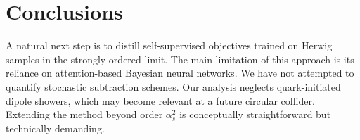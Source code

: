 \section{Conclusions}\label{sec:conclusions}

A natural next step is to distill self-supervised objectives trained on
Herwig samples in the strongly ordered limit. The main limitation of
this approach is its reliance on attention-based Bayesian neural
networks. We have not attempted to quantify stochastic subtraction
schemes. Our analysis neglects quark-initiated dipole showers, which may
become relevant at a future circular collider. Extending the method
beyond order $\alpha_s^2$ is conceptually straightforward but
technically demanding.

